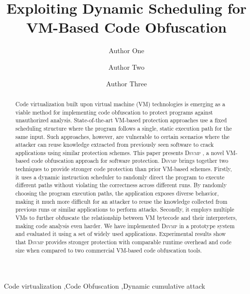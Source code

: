 \documentclass[preprint,12pt,3p]{elsarticle}
\newcommand{\DSVMP}{\textsc{Dsvmp }}
\begin{document}
\begin{frontmatter}

\title{Exploiting Dynamic Scheduling for VM-Based Code Obfuscation}


\author[label1]{Author One}
\address[label1]{School of Information Science and Technology, Northwest University, Xi'an, 710127, P.R. China.}
\address[label2]{School of Computing and Communications, Lancaster University, UK}%



\author[label1]{Author Two}

\author[label2]{Author Three}

\begin{abstract}
Code virtualization built upon virtual machine (VM) technologies is emerging as a viable method for implementing code obfuscation to protect programs against unauthorized analysis. State-of-the-art VM-based protection approaches use a fixed scheduling structure where the program follows a single, static execution path for the same input. Such approaches, however, are vulnerable to certain scenarios where the attacker can reuse knowledge extracted from previously seen software to crack applications using similar protection schemes. This paper presents \DSVMP, a novel VM-based code obfuscation approach for software protection. \DSVMP brings together two techniques to provide stronger code protection than prior VM-based schemes. Firstly, it uses a dynamic instruction scheduler to randomly direct the program to execute different paths without violating the correctness across different runs. By randomly choosing the program execution paths, the application exposes diverse behavior, making it much more difficult for an attacker to reuse the knowledge collected from previous runs or similar applications to perform attacks. Secondly, it employs multiple VMs to further obfuscate the relationship between VM bytecode and their interpreters, making code analysis even harder. We have implemented \DSVMP in a prototype system and evaluated it using a set of widely used applications. Experimental results show that \DSVMP provides stronger protection with comparable runtime overhead and code size when compared to two commercial VM-based code obfuscation tools.
\end{abstract}

\begin{keyword}
Code virtualization \sep Code Obfuscation \sep Dynamic cumulative attack
\end{keyword}

\end{frontmatter}
\end{document}
